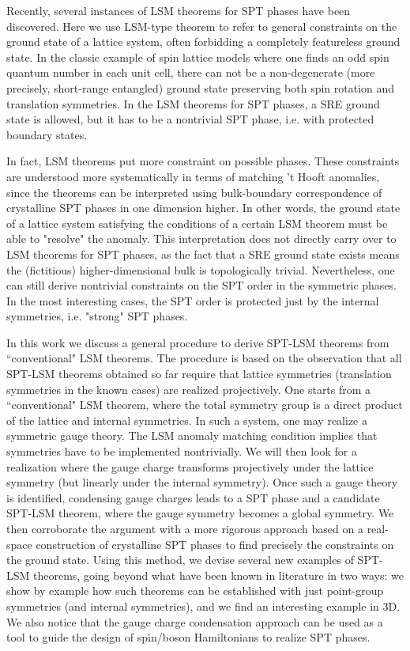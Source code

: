\documentclass[reprint,amsmath,amssymb,aps,pra,]{revtex4-1}
\begin{document}
Recently, several instances of LSM theorems for SPT phases have been discovered.  
Here we use LSM-type theorem to refer to general constraints on the ground state of a lattice system, often forbidding a completely featureless ground state. 
In the classic example of spin lattice models where one finds an odd spin quantum number in each unit cell, there can not be a non-degenerate (more precisely, short-range entangled) ground state preserving both spin rotation and translation symmetries. 
In the LSM theorems for SPT phases, a SRE ground state is allowed, but it has to be a nontrivial SPT phase, i.e. with protected boundary states. 

In fact, LSM theorems put more constraint on possible phases. 
These constraints are understood more systematically in terms of matching 't Hooft anomalies, since the theorems can be interpreted using bulk-boundary correspondence of crystalline SPT phases in one dimension higher. 
In other words, the ground state of a lattice system satisfying the conditions of a certain LSM theorem must be able to "resolve" the anomaly. 
This interpretation does not directly carry over to LSM theorems for SPT phases, as the fact that a SRE ground state exists means the (fictitious) higher-dimensional bulk is topologically trivial. 
Nevertheless, one can still derive nontrivial constraints on the SPT order in the symmetric phases. In the most interesting cases, the SPT order is protected just by the internal symmetries, i.e. "strong" SPT phases.

In this work we discuss a general procedure to derive SPT-LSM theorems from ``conventional" LSM theorems. The procedure is based on the observation that all SPT-LSM theorems obtained so far require that lattice symmetries (translation symmetries in the known cases) are realized projectively. One starts from a ``conventional" LSM theorem, where the total symmetry group is a direct product of the lattice and internal symmetries. In such a system, one may realize a symmetric gauge theory. The LSM anomaly matching condition implies that symmetries have to be implemented nontrivially. We will then look for a realization where the gauge charge transforms projectively under the lattice symmetry (but linearly under the internal symmetry). Once such a gauge theory is identified, condensing gauge charges leads to a SPT phase and a candidate SPT-LSM theorem, where the gauge symmetry becomes a global symmetry. We then corroborate the argument with a more rigorous approach based on a real-space construction of crystalline SPT phases to find precisely the constraints on the ground state.  Using this method, we devise several new examples of SPT-LSM theorems, going beyond what have been known in literature in two ways: we show by example how such theorems can be established with just point-group symmetries (and internal symmetries), and we find an interesting example in 3D.
We also notice that the gauge charge condensation approach can be used as a tool to guide the design of spin/boson Hamiltonians to realize SPT phases.
\end{document}
